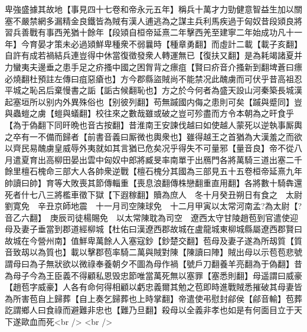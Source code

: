 卑強盛據其故地【事見四十七卷和帝永元五年】稱兵十萬才力勁健意智益生加以關塞不嚴禁網多漏精金良鐵皆為賊有漢人逋逃為之謀主兵利馬疾過于匈奴昔段熲良將習兵善戰有事西羌猶十餘年【段熲自桓帝延熹二年擊西羌至建寧二年始成功凡十一年】今育晏才策未必過熲鮮卑種衆不弱曩時【種章勇翻】而虛計二載【載子亥翻】自許有成若禍結兵連豈得中休當復徵發衆人轉運無已【復扶又翻】是為耗竭諸夏并力蠻夷夫邊垂之患手足之疥搔中國之困胷背之瘭疽【賢曰疥音介搔新到翻埤蒼曰瘭必燒翻杜預註左傳曰疽惡瘡也】方今郡縣盜賊尚不能禁况此醜虜而可伏乎昔高祖忍平城之恥呂后棄慢書之詬【詬古候翻恥也】方之於今何者為盛天設山河秦築長城漢起塞垣所以别内外異殊俗也【别彼列翻】苟無䠞國内侮之患則可矣【䠞與蹙同】豈與蟲螘之虜【螘與蟻翻】校往來之數哉雖或破之豈可殄盡而方令本朝為之旰食乎【為于偽翻下同旰晩也音古按翻】昔淮南王安諫伐越曰如使越人蒙死以逆執事厮輿之卒有一不備而歸者【前書音義曰厮微也輿衆也】雖得越王之首猶為大漢羞之而欲以齊民易醜虜皇威辱外夷就如其言猶已危矣况乎得失不可量邪【量音良】帝不從八月遣夏育出高柳田晏出雲中匈奴中郎將臧旻率南單于出鴈門各將萬騎三道出塞二千餘里檀石槐命三部大人各帥衆逆戰【檀石槐分其國為三部見五十五卷桓帝延熹九年帥讀曰帥】育等大敗喪其節傳輜重【喪息浪翻傳株戀翻重直用翻】各將數十騎犇還死者什七八三將檻車徵下獄【下遐稼翻】贖為庶人　冬十月癸丑朔日有食之　太尉劉寛免　辛丑京師地震　十一月司空陳球免　十二月甲寅以太常河南孟?為太尉【?音乙六翻】　庚辰司徒楊賜免　以太常陳耽為司空　遼西太守甘陵趙苞到官遣使迎母及妻子垂當到郡道經柳城【杜佑曰漢遼西郡故城在盧龍城東柳城縣屬遼西郡賢曰故城在今營州南】值鮮卑萬餘人入塞寇鈔【鈔楚交翻】苞母及妻子遂為所刼質【質音致刼以為質也】載以擊郡苞率騎二萬與賊對陳【陳讀曰陣】賊出母以示苞苞悲號謂母曰為子無狀欲以微祿奉養朝夕不圖為母作禍【號戶刀翻養羊亮翻為于偽翻】昔為母子今為王臣義不得顧私恩毁忠節唯當萬死無以塞罪【塞悉則翻】母遥謂曰威豪【趙苞字威豪】人各有命何得相顧以虧忠義爾其勉之苞即時進戰賊悉摧破其母妻皆為所害苞自上歸葬【自上奏乞歸葬也上時掌翻】帝遣使弔慰封鄃侯【鄃音輸】苞葬訖謂鄉人曰食祿而避難非忠也【難乃旦翻】殺母以全義非孝也如是有何面目立于天下遂歐血而死<br />
<br />
